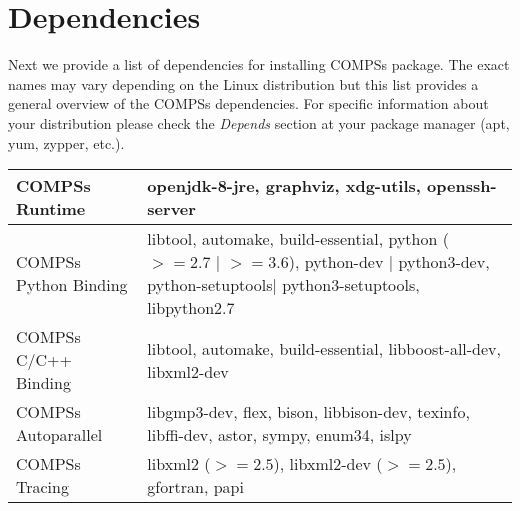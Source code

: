 
%

\section{Dependencies}
\label{subsec:packages_dependencies}
Next we provide a list of dependencies for installing COMPSs package. The exact names may vary depending on 
the Linux distribution but this list provides a general overview of the COMPSs dependencies. For specific information about
your distribution please check the \textit{Depends} section at your package manager (apt, yum, zypper, etc.).

\bgroup
  \def\arraystretch{1.5}
  \begin{center}
    \begin{tabular}{ p{6cm} | p{10cm} } 
    COMPSs Runtime 		& openjdk-8-jre, graphviz, xdg-utils, openssh-server \\ \hline  
    COMPSs Python Binding 	& libtool, automake, build-essential, python ($>= 2.7$ | $>=3.6$), python-dev | python3-dev, python-setuptools| python3-setuptools, libpython2.7 \\ \hline 
    COMPSs C/C++ Binding 	& libtool, automake, build-essential, libboost-all-dev, libxml2-dev \\ \hline
    COMPSs Autoparallel		& libgmp3-dev, flex, bison, libbison-dev, texinfo, libffi-dev, astor, sympy, enum34, islpy \\ \hline
    COMPSs Tracing 		& libxml2 ($>= 2.5$), libxml2-dev ($>= 2.5$), gfortran, papi \\ \hline   
    \end{tabular}
  \end{center}
\egroup

